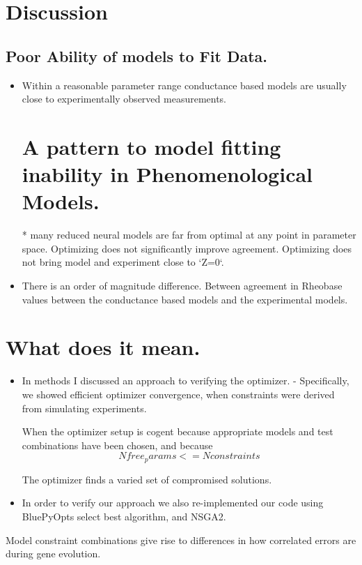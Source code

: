 \section{Discussion}

\subsection{Poor Ability of models to Fit Data.}
\begin{itemize}


\item Within a reasonable parameter range conductance based models are usually close to experimentally observed measurements.

\section{A pattern to model fitting inability in Phenomenological Models.}
* many reduced neural models are far from optimal at any point in parameter space. Optimizing does not significantly improve agreement. Optimizing does not bring model and experiment close to `Z=0`.

\item There is an order of magnitude difference. Between agreement in Rheobase values between the conductance based models and the experimental models. 

\end{itemize}

\section{What does it mean.}
\begin{itemize}

\item  In methods I discussed an approach to verifying the optimizer.
- Specifically, we showed efficient optimizer convergence, when constraints were derived from simulating experiments.

When the optimizer setup is cogent because appropriate models and test combinations have been chosen, and because 
\begin{equation}

N free_params <= N constraints
\end{equation}

The optimizer finds a varied set of compromised solutions.

\item  In order to verify our approach we also re-implemented our code using BluePyOpts select best algorithm, and NSGA2.
\end{itemize}

Model constraint combinations give rise to differences in how correlated errors are during gene evolution. 